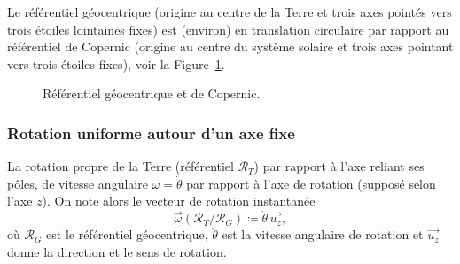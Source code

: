             \begin{example}
                Le référentiel géocentrique (origine au centre de la Terre et trois axes pointés vers trois étoiles lointaines \og fixes\fg) est (environ) en translation circulaire par rapport au référentiel de Copernic (origine au centre du système solaire et trois axes pointant vers trois étoiles \og fixes\fg), voir la Figure~\ref{fig:refentiel_geocentrique_copernic}.
                \begin{figure}[!h]
                    \centering
                    \caption{Référentiel géocentrique et de Copernic.}    
                    \label{fig:refentiel_geocentrique_copernic}
                \end{figure}
            \end{example}

        \subsubsection{Rotation uniforme autour d'un axe fixe}
            
            \begin{example}
                La rotation propre de la Terre (référentiel $\mathcal{R}_{T}$) par rapport à l'axe reliant ses pôles, de vitesse angulaire $\omega=\dot{\theta}$ par rapport à l'axe de rotation (supposé selon l'axe $z$). On note alors le vecteur de rotation instantanée
                \begin{equation*}
                    \vec{\omega}(\mathcal{R}_{T}/\mathcal{R}_{G})\coloneqq \dot{\theta}\,\vec{u_z},
                \end{equation*}
                où $\mathcal{R}_{G}$ est le référentiel géocentrique, $\dot{\theta}$ est la vitesse angulaire de rotation et $\vec{u_z}$ donne la direction et le sens de rotation.
            \end{example}

